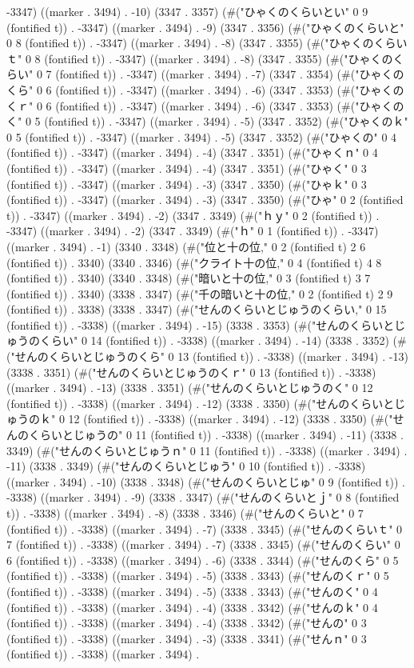 -3347) ((marker . 3494) . -10) (3347 . 3357) (#("ひゃくのくらいとい" 0 9 (fontified t)) . -3347) ((marker . 3494) . -9) (3347 . 3356) (#("ひゃくのくらいと" 0 8 (fontified t)) . -3347) ((marker . 3494) . -8) (3347 . 3355) (#("ひゃくのくらいｔ" 0 8 (fontified t)) . -3347) ((marker . 3494) . -8) (3347 . 3355) (#("ひゃくのくらい" 0 7 (fontified t)) . -3347) ((marker . 3494) . -7) (3347 . 3354) (#("ひゃくのくら" 0 6 (fontified t)) . -3347) ((marker . 3494) . -6) (3347 . 3353) (#("ひゃくのくｒ" 0 6 (fontified t)) . -3347) ((marker . 3494) . -6) (3347 . 3353) (#("ひゃくのく" 0 5 (fontified t)) . -3347) ((marker . 3494) . -5) (3347 . 3352) (#("ひゃくのｋ" 0 5 (fontified t)) . -3347) ((marker . 3494) . -5) (3347 . 3352) (#("ひゃくの" 0 4 (fontified t)) . -3347) ((marker . 3494) . -4) (3347 . 3351) (#("ひゃくｎ" 0 4 (fontified t)) . -3347) ((marker . 3494) . -4) (3347 . 3351) (#("ひゃく" 0 3 (fontified t)) . -3347) ((marker . 3494) . -3) (3347 . 3350) (#("ひゃｋ" 0 3 (fontified t)) . -3347) ((marker . 3494) . -3) (3347 . 3350) (#("ひゃ" 0 2 (fontified t)) . -3347) ((marker . 3494) . -2) (3347 . 3349) (#("ｈｙ" 0 2 (fontified t)) . -3347) ((marker . 3494) . -2) (3347 . 3349) (#("ｈ" 0 1 (fontified t)) . -3347) ((marker . 3494) . -1) (3340 . 3348) (#("位と十の位," 0 2 (fontified t) 2 6 (fontified t)) . 3340) (3340 . 3346) (#("クライト十の位," 0 4 (fontified t) 4 8 (fontified t)) . 3340) (3340 . 3348) (#("暗いと十の位," 0 3 (fontified t) 3 7 (fontified t)) . 3340) (3338 . 3347) (#("千の暗いと十の位," 0 2 (fontified t) 2 9 (fontified t)) . 3338) (3338 . 3347) (#("せんのくらいとじゅうのくらい," 0 15 (fontified t)) . -3338) ((marker . 3494) . -15) (3338 . 3353) (#("せんのくらいとじゅうのくらい" 0 14 (fontified t)) . -3338) ((marker . 3494) . -14) (3338 . 3352) (#("せんのくらいとじゅうのくら" 0 13 (fontified t)) . -3338) ((marker . 3494) . -13) (3338 . 3351) (#("せんのくらいとじゅうのくｒ" 0 13 (fontified t)) . -3338) ((marker . 3494) . -13) (3338 . 3351) (#("せんのくらいとじゅうのく" 0 12 (fontified t)) . -3338) ((marker . 3494) . -12) (3338 . 3350) (#("せんのくらいとじゅうのｋ" 0 12 (fontified t)) . -3338) ((marker . 3494) . -12) (3338 . 3350) (#("せんのくらいとじゅうの" 0 11 (fontified t)) . -3338) ((marker . 3494) . -11) (3338 . 3349) (#("せんのくらいとじゅうｎ" 0 11 (fontified t)) . -3338) ((marker . 3494) . -11) (3338 . 3349) (#("せんのくらいとじゅう" 0 10 (fontified t)) . -3338) ((marker . 3494) . -10) (3338 . 3348) (#("せんのくらいとじゅ" 0 9 (fontified t)) . -3338) ((marker . 3494) . -9) (3338 . 3347) (#("せんのくらいとｊ" 0 8 (fontified t)) . -3338) ((marker . 3494) . -8) (3338 . 3346) (#("せんのくらいと" 0 7 (fontified t)) . -3338) ((marker . 3494) . -7) (3338 . 3345) (#("せんのくらいｔ" 0 7 (fontified t)) . -3338) ((marker . 3494) . -7) (3338 . 3345) (#("せんのくらい" 0 6 (fontified t)) . -3338) ((marker . 3494) . -6) (3338 . 3344) (#("せんのくら" 0 5 (fontified t)) . -3338) ((marker . 3494) . -5) (3338 . 3343) (#("せんのくｒ" 0 5 (fontified t)) . -3338) ((marker . 3494) . -5) (3338 . 3343) (#("せんのく" 0 4 (fontified t)) . -3338) ((marker . 3494) . -4) (3338 . 3342) (#("せんのｋ" 0 4 (fontified t)) . -3338) ((marker . 3494) . -4) (3338 . 3342) (#("せんの" 0 3 (fontified t)) . -3338) ((marker . 3494) . -3) (3338 . 3341) (#("せんｎ" 0 3 (fontified t)) . -3338) ((marker . 3494) . 